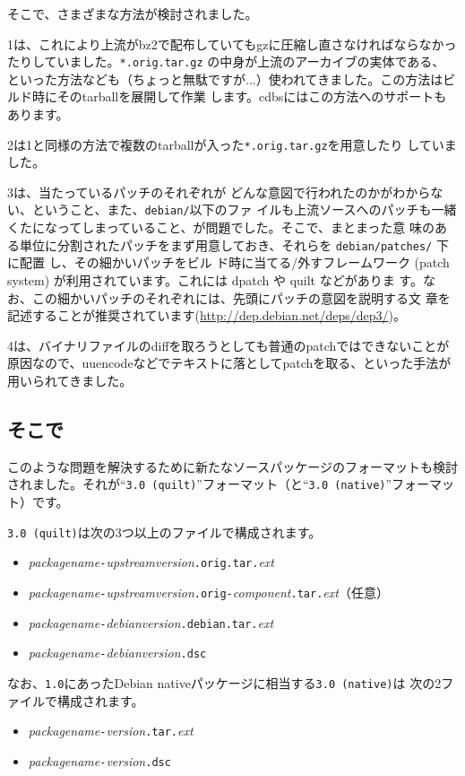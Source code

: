 \documentclass[mingoth,a4paper]{jsarticle}
\begin{document}
そこで、さまざまな方法が検討されました。

1は、これにより上流がbz2で配布していてもgzに圧縮し直さなければならなかっ
たりしていました。\verb|*.orig.tar.gz| の中身が上流のアーカイブの実体である、
といった方法なども（ちょっと無駄ですが...）使われてきました。この方法はビルド時にそのtarballを展開して作業
します。cdbsにはこの方法へのサポートもあります。

2は1と同様の方法で複数のtarballが入った\verb|*.orig.tar.gz|を用意したり
していました。

3は、当たっているパッチのそれぞれが
どんな意図で行われたのかがわからない、ということ、また、\verb|debian/|以下のファ
イルも上流ソースへのパッチも一緒くたになってしまっていること、が問題でした。そこで、まとまった意
味のある単位に分割されたパッチをまず用意しておき、それらを
\verb|debian/patches/| 下に配置
し、その細かいパッチをビル
ド時に当てる/外すフレームワーク
(patch system) が利用されています。これには dpatch や quilt などがありま
す。なお、この細かいパッチのそれぞれには、先頭にパッチの意図を説明する文
章を記述することが推奨されています(\url{http://dep.debian.net/deps/dep3/})。

4は、バイナリファイルのdiffを取ろうとしても普通のpatchではできないことが
原因なので、uuencodeなどでテキストに落としてpatchを取る、といった手法が
用いられてきました。

\subsection{そこで}
このような問題を解決するために新たなソースパッケージのフォーマットも検討
されました。それが``\verb|3.0 (quilt)|''フォーマット（と``\verb|3.0 (native)|''フォーマット）です。

\verb|3.0 (quilt)|は次の3つ以上のファイルで構成されます。
\begin{itemize}
 \item \textit{packagename}\verb|-|\textit{upstreamversion}\verb|.orig.tar.|\textit{ext}
 \item
      \textit{packagename}\verb|-|\textit{upstreamversion}\verb|.orig-|\textit{component}\verb|.tar.|\textit{ext}（任意）
 \item \textit{packagename}\verb|-|\textit{debianversion}\verb|.debian.tar.|\textit{ext}
 \item \textit{packagename}\verb|-|\textit{debianversion}\verb|.dsc|
\end{itemize}

なお、\verb|1.0|にあったDebian nativeパッケージに相当する\verb|3.0 (native)|は
次の2ファイルで構成されます。
\begin{itemize}
 \item \textit{packagename}\verb|-|\textit{version}\verb|.tar.|\textit{ext}
 \item \textit{packagename}\verb|-|\textit{version}\verb|.dsc|
\end{itemize}
\end{document}
